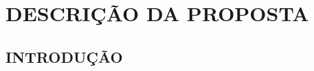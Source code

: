 
\chapter{DESCRIÇÃO DA PROPOSTA}
\label{chap:descricao}

\section{INTRODUÇÃO}
\label{sec:introducao}










